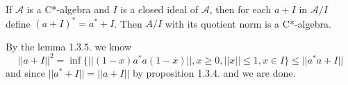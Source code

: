 \begin{theorem}
    If $\mathcal{A}$ is a C*-algebra and $I$ is a closed ideal of $\mathcal{A}$, then for each $a+I$ in $\mathcal{A}/I$ define $(a+I)^* = a^*+I$. Then $A/I$ with its quotient norm is a C*-algebra.
\end{theorem}
\Pf\par
    By the lemma 1.3.5. we know
    \[||a+I||^2 = \inf\{||(1-x)a^*a(1-x)||, x\geq 0, ||x||\leq 1, x\in I\}\leq ||a^*a+I||\]
    and since $||a^*+I|| = ||a+I||$ by proposition 1.3.4. and we are done.
    
